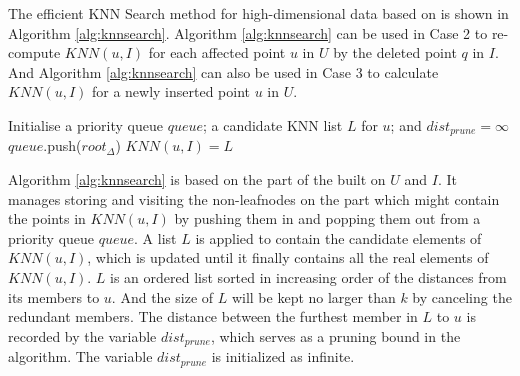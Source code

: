 The efficient KNN Search method for high-dimensional data based on \dualtree is shown in Algorithm \ref{alg:knnsearch}. Algorithm \ref{alg:knnsearch} can be used in Case 2 to re-compute $KNN(u,I)$ for each affected point $u$ in $U$ by the deleted point $q$ in $I$. And Algorithm \ref{alg:knnsearch} can also be used in Case 3 to calculate $KNN(u,I)$ for a newly inserted point $u$ in $U$. 



\begin{algorithm}[t]
\caption{KNN\_\dualtree($u$)}\label{alg:knnsearch}
Initialise a priority queue $queue$; a candidate KNN list $L$ for $u$; and $dist_{prune}=\infty$\;
$queue$.push($root_{\Delta}$)\;
$KNN(u,I)=L$\;

\end{algorithm}

Algorithm \ref{alg:knnsearch} is based on the \deltatree part of the \dualtree built on $U$ and $I$. It manages storing and visiting the non-leafnodes on the \deltatree part which might contain the points in $KNN(u,I)$ by pushing them in and popping them out from a priority queue $queue$. A list $L$ is applied to contain the candidate elements of $KNN(u,I)$, which is updated until it finally contains all the real elements of $KNN(u,I)$. $L$ is an ordered list sorted in increasing order of the distances from its members to $u$. And the size of $L$ will be kept no larger than $k$ by canceling the redundant members. The distance between the furthest member in $L$ to $u$ is recorded by the variable $dist_{prune}$, which serves as a pruning bound in the algorithm. The variable $dist_{prune}$ is initialized as infinite.

